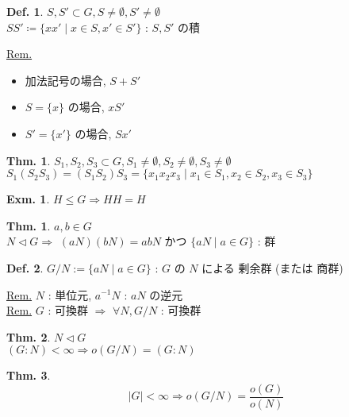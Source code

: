\documentclass[uplatex,dvipdfmx,9pt]{beamer}
\newcommand{\nsubgroup}{\vartriangleleft} %
\newcounter{textThmCount}
\newcounter{textExmCount}
\theoremstyle{definition} %
\newtheorem{defn}{Def.}[subsection] %
\newtheorem{thm}{Thm.}[subsection] %
\newtheorem{thmText}[textThmCount]{Thm.}
\theoremstyle{example}
\newtheorem{exmText}[textExmCount]{Exm.}
\begin{document}
      \begin{frame}
      
        \begin{defn}
          $S,S' \subset G, S \neq \emptyset, S' \neq \emptyset$ \\
          $SS' \coloneqq \{xx' \mid x \in S, x' \in S'\}$ : $S,S'$ の\alert{積} \\
        \end{defn}
        \underline{Rem.}
        \begin{itemize}
          \item 加法記号の場合, $S+S'$
          \item $S = \{x\}$ の場合, $xS'$
          \item $S' = \{x'\}$ の場合, $Sx'$
        \end{itemize}

        \begin{thm}
          $S_1,S_2,S_3 \subset G, S_1 \neq \emptyset, S_2 \neq \emptyset, S_3 \neq \emptyset$ \\
          $S_1(S_2S_3) = (S_1S_2)S_3 = \{x_1x_2x_3 \mid x_1 \in S_1, x_2 \in S_2, x_3 \in S_3\}$
        \end{thm}
        
        \begin{exmText}
          $H \le G \Rightarrow HH = H$
        \end{exmText}

      \end{frame}

      \begin{frame}
      
        \begin{thmText}
          $a,b \in G$ \\
          $N \nsubgroup G \Rightarrow$ $(aN)(bN) = abN$ かつ $\{aN \mid a \in G\}$ : 群
        \end{thmText}

        \begin{defn}
          $G/N := \{aN \mid a \in G\}$ : $G$ の $N$ による \alert{剰余群} (または \alert{商群})
        \end{defn}
        \underline{Rem.} $N$ : 単位元, $a^{-1}N$ : $aN$ の逆元 \\
        \underline{Rem.} $G$ : 可換群 $\Rightarrow$ $\forall N, G/N$ : 可換群

        \begin{thm}
          $N \nsubgroup G$ \\
          $(G:N) < \infty \Rightarrow o(G/N) = (G:N)$
        \end{thm}

        \begin{thm}
          \[|G| < \infty \Rightarrow o(G/N) = \frac{o(G)}{o(N)}\]
        \end{thm}

      \end{frame}
\end{document}
